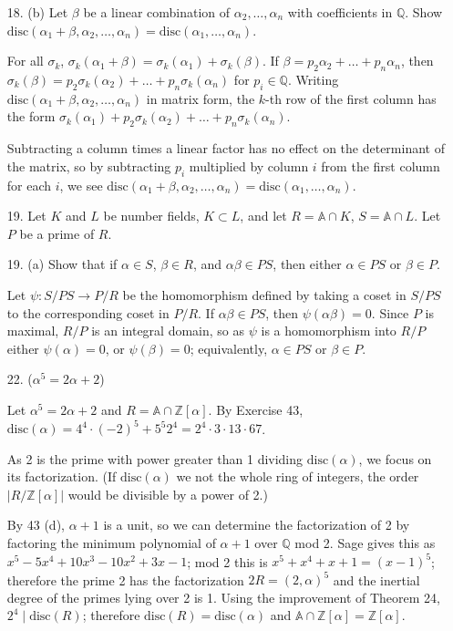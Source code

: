 \documentclass{article}
\newcommand{\Q}[0]{\mathbb{Q}}
\newcommand{\Z}[0]{\mathbb{Z}}
\newcommand{\disc}[1]{\text{disc}(#1)}
\newcommand{\ringofintegers}[1]{\mathbb{A} \cap #1}
\begin{document}
\begin{enumerate}
\item[18. (b)] Let $\beta$ be a linear combination of $\alpha_2, \ldots, \alpha_n$ with coefficients in $\Q$.  Show $\disc{\alpha_1 + \beta, \alpha_2, \ldots, \alpha_n} = \disc{\alpha_1, \ldots, \alpha_n}$.

For all $\sigma_k$, $\sigma_k(\alpha_1 + \beta) = \sigma_k(\alpha_1) + \sigma_k(\beta)$.  If $\beta = p_2 \alpha_2 + \ldots + p_n \alpha_n$, then $\sigma_k(\beta) = p_2\sigma_k(\alpha_2) + \ldots + p_n\sigma_k(\alpha_n)$ for $p_i \in \Q$.  Writing $\disc{\alpha_1 + \beta, \alpha_2, \ldots, \alpha_n}$ in matrix form, the $k$-th row of the first column has the form $\sigma_k(\alpha_1) + p_2\sigma_k(\alpha_2) + \ldots + p_n\sigma_k(\alpha_n)$.

Subtracting a column times a linear factor has no effect on the determinant of the matrix, so by subtracting $p_i$ multiplied by column $i$ from the first column for each $i$, we see $\disc{\alpha_1 + \beta, \alpha_2, \ldots, \alpha_n} = \disc{\alpha_1, \ldots, \alpha_n}$.

\item[19.] Let $K$ and $L$ be number fields, $K \subset L$, and let $R = \ringofintegers{K}$, $S = \ringofintegers{L}$.  Let $P$ be a prime of $R$.

\item[19. (a)] Show that if $\alpha \in S$, $\beta \in R$, and $\alpha \beta \in PS$, then either $\alpha \in PS$ or $\beta \in P$.

Let $\psi : S / PS \to P / R$ be the homomorphism defined by taking a coset in $S / PS$ to the corresponding coset in $P / R$.  If $\alpha\beta \in PS$, then $\psi(\alpha\beta) = 0$.  Since $P$ is maximal, $R / P$ is an integral domain, so as $\psi$ is a homomorphism into $R / P$ either $\psi(\alpha) = 0$, or $\psi(\beta) = 0$; equivalently, $\alpha \in PS$ or $\beta \in P$.

\item[22. ($\alpha^5 = 2\alpha + 2$)]

Let $\alpha^5 = 2\alpha + 2$ and $R = \ringofintegers{\Z[\alpha]}$.  By Exercise 43, $\disc{\alpha} = 4^4 \cdot (-2)^5 + 5^5 2^4 = 2^4 \cdot 3 \cdot 13 \cdot 67$.

As 2 is the prime with power greater than 1 dividing $\disc{\alpha}$,  we focus on its factorization.  (If $\disc{\alpha}$ we not the whole ring of integers, the order $|R / \Z[\alpha]|$ would be divisible by a power of 2.)

By 43 (d), $\alpha + 1$ is a unit, so we can determine the factorization of 2 by factoring the minimum polynomial of $\alpha + 1$ over $\Q$ mod 2.  Sage gives this as $x^5 - 5x^4 + 10x^3 - 10x^2 + 3x - 1$; mod 2 this is $x^5 + x^4 + x + 1 = (x - 1)^5$; therefore the prime 2 has the factorization $2R = (2, \alpha)^5$ and the inertial degree of the primes lying over 2 is 1.  Using the improvement of Theorem 24, $2^4 \mid \disc{R}$; therefore $\disc{R} = \disc{\alpha}$ and $\ringofintegers{\Z[\alpha]} = \Z[\alpha]$.


\end{enumerate}
\end{document}
